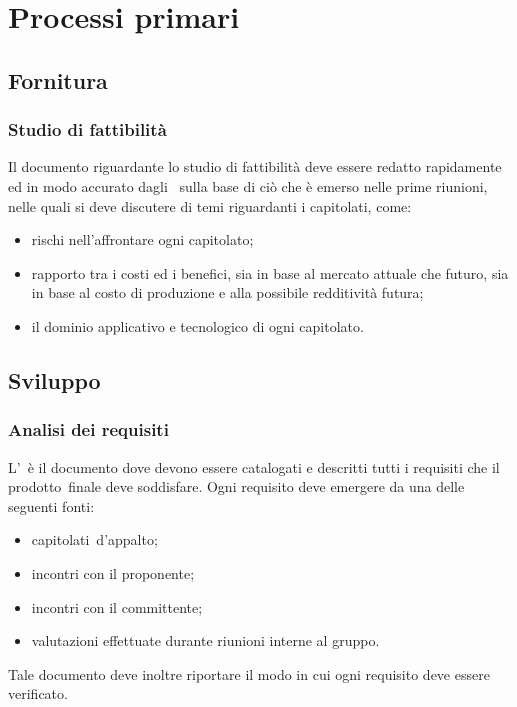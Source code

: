 \documentclass[../NormeProgetto.tex]{subfiles}
\begin{document}
\section{Processi primari}
	\subsection{Fornitura}
		\subsubsection{Studio di fattibilità}
			Il documento riguardante lo studio di fattibilità deve essere redatto rapidamente ed in modo accurato dagli \analisti\ sulla base di ciò che è emerso nelle prime riunioni, nelle quali si deve discutere di temi riguardanti i capitolati, come:
			\begin{itemize}
				\item rischi nell'affrontare ogni capitolato\g;
				\item rapporto tra i costi ed i benefici, sia in base al mercato attuale che futuro, sia in base al costo di produzione e alla possibile redditività futura;
				\item il dominio applicativo e tecnologico di ogni capitolato\g.
			\end{itemize}
	\subsection{Sviluppo}
		\subsubsection{Analisi dei requisiti}
			L'\analisideirequisiti\ è il documento dove devono essere catalogati e descritti tutti i requisiti che il prodotto\g\ finale deve soddisfare. Ogni requisito deve emergere da una delle seguenti fonti:
			\begin{itemize}
				\item capitolati\g\ d'appalto;
				\item incontri con il proponente;
				\item incontri con il committente;
				\item valutazioni effettuate durante riunioni interne al gruppo.
			\end{itemize}
			Tale documento deve inoltre riportare il modo in cui ogni requisito deve essere verificato.
\end{document}
